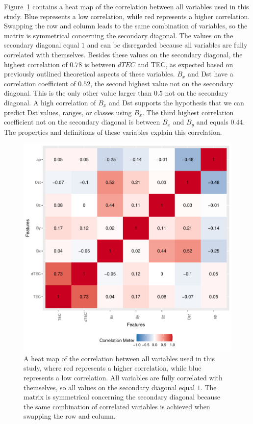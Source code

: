 \documentclass[sn-mathphys-num]{sn-jnl}%
\begin{document}
Figure~\ref{fig:correlation} contains a heat map of the correlation between all variables used in this study. Blue represents a low correlation, while red represents a higher correlation. Swapping the row and column leads to the same combination of variables, so the matrix is symmetrical concerning the secondary diagonal. The values on the secondary diagonal equal $1$ and can be disregarded because all variables are fully correlated with themselves. Besides these values on the secondary diagonal, the highest correlation of $0.78$ is between $dTEC$ and TEC, as expected based on previously outlined theoretical aspects of these variables. $B_{x}$ and Dst have a correlation coefficient of $0.52$, the second highest value not on the secondary diagonal. This is the only other value larger than $0.5$ not on the secondary diagonal. A high correlation of $B_{x}$ and Dst supports the hypothesis that we can predict Dst values, ranges, or classes using $B_{x}$. The third highest correlation coefficient not on the secondary diagonal is between $B_{x}$ and $B_{y}$ and equals $0.44$. The properties and definitions of these variables explain this correlation.

\begin{figure}
 \centering
 \includegraphics[width=0.9\linewidth]{correlation.pdf}
    \caption{A heat map of the correlation between all variables used in this study, where red represents a higher correlation, while blue represents a low correlation. All variables are fully correlated with themselves, so all values on the secondary diagonal equal $1$. The matrix is symmetrical concerning the secondary diagonal because the same combination of correlated variables is achieved when swapping the row and column.}
    \label{fig:correlation}
\end{figure}
\end{document}
